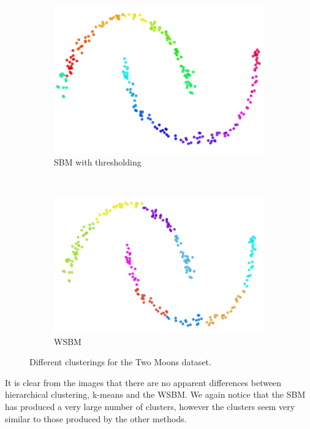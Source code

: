 \documentclass[conference]{IEEEtran}
\begin{document}
\begin{figure}[h]
\begin{subfigure}[c]{0.48\columnwidth}
    \end{subfigure}
    ~
    \begin{subfigure}[c]{0.48\columnwidth}
        \includegraphics[width=\columnwidth]{results/moons_sbm.png}
        \caption{SBM with thresholding}
        \label{fig:synthetic_ina}
    \end{subfigure}
    ~
    \begin{subfigure}[c]{0.48\columnwidth}
        \includegraphics[width=\columnwidth]{results/moons_wsbm.png}
        \caption{WSBM}
        \label{fig:synthetic_ina}
    \end{subfigure}
    \caption{Different clusterings for the Two Moons dataset.}\label{fig:results_moons}
\end{figure}

It is clear from the images that there are no apparent differences between hierarchical clustering, k-means and the WSBM. We again notice that the SBM has produced a very large number of clusters, however the clusters seem very similar to those produced by the other methods.
\end{document}

